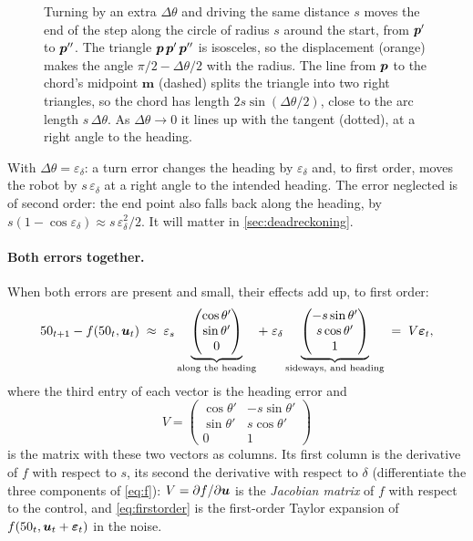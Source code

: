 \begin{figure}[ht]
\caption{Turning by an extra $\Delta\theta$ and driving the same distance
$s$ moves the end of the step along the circle of radius $s$ around the
start, from $\bm{p}'$ to $\bm{p}''$. The triangle $\bm{p}\,\bm{p}'\,\bm{p}''$ is isosceles, so
the displacement (orange) makes the angle $\pi/2-\Delta\theta/2$ with the
radius. The line from $\bm{p}$ to the chord's midpoint $\bm m$ (dashed) splits
the triangle into two right triangles, so the chord has length
$2s\sin(\Delta\theta/2)$, close to the arc length $s\,\Delta\theta$. As
$\Delta\theta\to0$ it lines up with the tangent (dotted), at a right angle to
the heading.}
\label{fig:tangent}
\end{figure}

With $\Delta\theta=\varepsilon_\delta$: a turn error changes the heading by
$\varepsilon_\delta$ and, to first order, moves the robot by
$s\,\varepsilon_\delta$ at a right angle to the intended heading. The
error neglected is of second order: the end point also falls back along
the heading, by $s(1-\cos\varepsilon_\delta)\approx
s\,\varepsilon_\delta^2/2$. It will matter in \cref{sec:deadreckoning}.

\paragraph{Both errors together.} When both errors are present and small,
their effects add up, to first order:
\begin{equation}\label{eq:firstorder}
  50_{t+1}-f(50_t,\bm{u}_t)\;\approx\;
  \varepsilon_s\underbrace{\begin{pmatrix}\cos\theta'\\ \sin\theta'\\ 0
  \end{pmatrix}}_{\text{along the heading}}
  +\;\varepsilon_\delta\underbrace{\begin{pmatrix}-s\sin\theta'\\
  s\cos\theta'\\ 1\end{pmatrix}}_{\text{sideways, and heading}}
  \;=\;V\bm{\varepsilon}_t,
\end{equation}
where the third entry of each vector is the heading error and
\[
  V=\begin{pmatrix}\cos\theta'&-s\sin\theta'\\ \sin\theta'&s\cos\theta'
  \\0&1\end{pmatrix}
\]
is the matrix with these two vectors as columns. Its first column is the
derivative of $f$ with respect to $s$, its second the derivative with
respect to $\delta$ (differentiate the three components of \eqref{eq:f}):
$V=\partial f/\partial\bm{u}$ is the \emph{Jacobian matrix} of $f$ with
respect to the control, and \eqref{eq:firstorder} is the first-order Taylor
expansion of $f(50_t,\bm{u}_t+\bm{\varepsilon}_t)$ in the noise.

